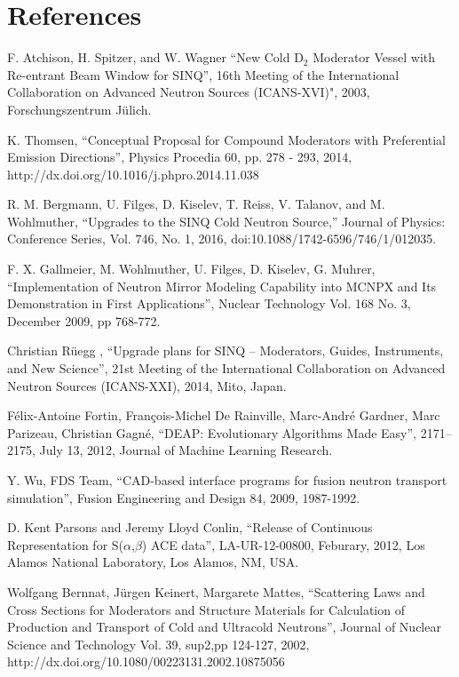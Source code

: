 \documentclass[a4paper]{jpconf}
\begin{document}
\section*{References}
\begin{thebibliography}{9}


		F. Atchison, H. Spitzer, and W. Wagner 
		``New Cold {D$_2$} Moderator Vessel with Re-entrant Beam Window for {SINQ}'',
		16th Meeting of the International Collaboration on Advanced Neutron Sources (ICANS-XVI)", 2003, Forschungszentrum J{\"u}lich.

		K. Thomsen,
		``Conceptual Proposal for Compound Moderators with Preferential Emission Directions'',
		Physics Procedia 60, pp. 278 - 293, 2014, http://dx.doi.org/10.1016/j.phpro.2014.11.038

		R. M. Bergmann, U. Filges, D. Kiselev, T. Reiss, V. Talanov, and M. Wohlmuther, 
		``Upgrades to the SINQ Cold Neutron Source,'' 
		Journal of Physics: Conference Series, Vol. 746, No. 1, 2016, doi:10.1088/1742-6596/746/1/012035.

	     F. X. Gallmeier, M. Wohlmuther, U. Filges, D. Kiselev, G. Muhrer,
	     ``Implementation of Neutron Mirror Modeling Capability into MCNPX and Its Demonstration in First Applications'',
	     Nuclear Technology Vol. 168 No. 3, December 2009, pp 768-772. 

		Christian R{\"u}egg ,
		``Upgrade plans for {SINQ} -- Moderators, Guides, Instruments, and New Science'',
		 21st Meeting of the International Collaboration on Advanced Neutron Sources (ICANS-XXI), 2014, Mito, Japan.

	     F\'elix-Antoine Fortin, Fran\c{c}ois-Michel {De Rainville}, Marc-Andr\'e Gardner, Marc Parizeau, Christian Gagn\'e,
	     ``{DEAP}: Evolutionary Algorithms Made Easy'', 2171--2175, July 13, 2012, Journal of Machine Learning Research. 

	     Y. Wu, FDS Team, 
	     ``CAD-based interface programs for fusion neutron transport simulation'', 
	     Fusion Engineering and Design 84, 2009, 1987-1992.

		 D. Kent Parsons and Jeremy Lloyd Conlin, 
		``Release of Continuous Representation for S($\alpha$,$\beta$) ACE data'', 
		LA-UR-12-00800, Feburary, 2012, Los Alamos National Laboratory,	Los Alamos, NM, USA.
	   
	     Wolfgang Bernnat, J{\"u}rgen Keinert, Margarete Mattes,
	     ``Scattering Laws and Cross Sections for Moderators and Structure Materials for Calculation of Production and Transport of Cold and Ultracold Neutrons'',
	     Journal of Nuclear Science and Technology Vol. 39, sup2,pp 124-127, 2002, http://dx.doi.org/10.1080/00223131.2002.10875056


\end{thebibliography}
\end{document}
